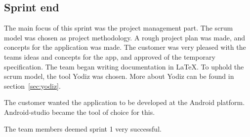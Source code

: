 \subsection{Sprint end}
The main focus of this sprint was the project management part. The scrum model was chosen as project methodology. 
A rough project plan was made, and concepts for the application was made.
The customer was very pleased with the teams ideas and concepts for the app, and approved of the temporary specification. 
The team began writing documentation in \LaTeX. To uphold the scrum model, the tool Yodiz was chosen. More about Yodiz can be found in section~\ref{sec:yodiz}.

The customer wanted the application to be developed at the Android platform. Android-studio became the tool of choice for this.

The team members deemed sprint 1 very successful.


